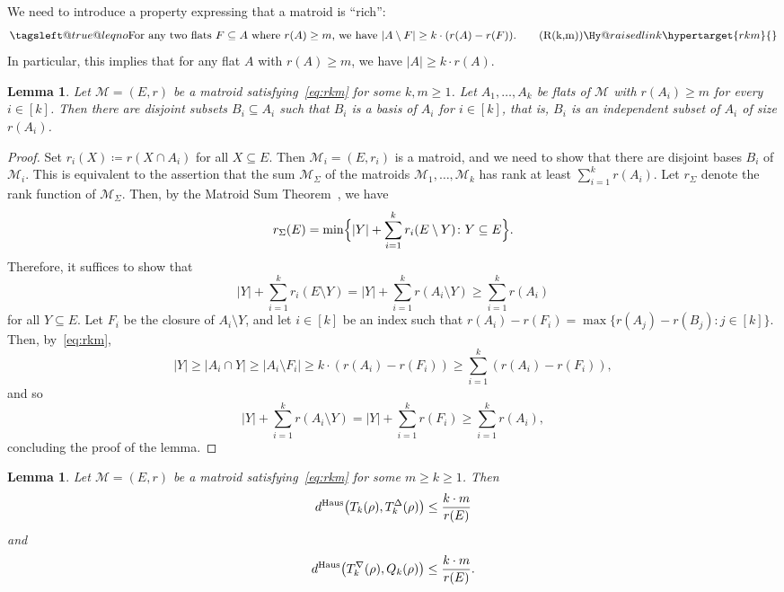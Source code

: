 \documentclass[10pt]{article}
\makeatletter
\newcommand{\leqnomode}{\tagsleft@true\let\veqno\@@leqno}
\newcommand{\linkdest}[1]{\Hy@raisedlink{\hypertarget{#1}{}}}
\theoremstyle{plain}
\newtheorem{lem}[thm]{Lemma}
\theoremstyle{definition}
\newcommand{\MM}{\mathcal{M}}
\newcommand{\Haus}{{\text{\rm Haus}}}
\makeatother
\begin{document}
We need to introduce a property expressing that a matroid is ``rich'':
\begin{equation*}\leqnomode
    \text{For any two flats $F\subseteq A$ where $r(A)\ge m$, we have
$|A\setminus F|\ge k\cdot (r(A)-r(F))$.} \tag*{(R(k,m))}\linkdest{rkm}{} \label{eq:rkm}
\end{equation*}
In particular, this implies that for any flat $A$ with $r(A)\ge m$, we have $|A|\ge k\cdot r(A)$.

\begin{lem}\label{LEM:M-A-BASE}
Let $\MM=(E,r)$ be a matroid satisfying~\ref{eq:rkm} for some $k,m\ge 1$.
Let $A_1,\dots,A_k$ be flats of $\MM$ with $r(A_i)\ge m$ for every $i\in[k]$. Then
there are disjoint subsets $B_i\subseteq A_i$ such that $B_i$ is a basis of
$A_i$ for $i\in[k]$, that is, $B_i$ is an independent subset of $A_i$ of size $r(A_i)$.
\end{lem}
\begin{proof}
Set $r_i(X)\coloneqq r(X\cap A_i)$ for all $X\subseteq E$. Then $\MM_i=(E,r_i)$ is a matroid, and we need to show that there are disjoint bases $B_i$ of $\MM_i$. This is equivalent to the
assertion that the sum $\MM_\Sigma$ of the matroids $\MM_1,\dots,\MM_k$ has rank at least 
$\sum_{i=1}^k r(A_i)$. Let $r_\Sigma$ denote the rank function of $\MM_\Sigma$. Then, by the Matroid Sum Theorem~\cite{edmonds1965transversals}, we have
\[
r_\Sigma(E) = \min\Bigl\{|Y| + \sum_{i=1}^k r_i(E\setminus Y)\colon Y\subseteq E\Bigr\}.
\]
Therefore, it suffices to show that 
\begin{equation*}\label{EQ:Y-BIG}
|Y| + \sum_{i=1}^k r_i(E\setminus Y)
=|Y| + \sum_{i=1}^k r(A_i\setminus Y)
\ge \sum_{i=1}^k r(A_i)
\end{equation*}
for all $Y\subseteq E$. Let $F_i$ be the closure of $A_i\setminus Y$, and let
$i\in[k]$ be an index such that $r(A_i)-r(F_i)=\max\{r(A_j)-r(B_j)\colon j\in[k]\}$. Then, by~\ref{eq:rkm},
\[
|Y| \ge |A_i\cap Y| \ge |A_i\setminus F_i|\ge k \cdot (r(A_i)-r(F_i))\ge \sum_{i=1}^k (r(A_i)-r(F_i)),
\]
and so
\[
|Y|+ \sum_{i=1}^k r(A_i\setminus Y) = |Y|+ \sum_{i=1}^k r(F_i) \ge \sum_{i=1}^k r(A_i),
\]
concluding the proof of the lemma.
\end{proof}

\begin{lem}\label{LEM:M-A-BASE2}
Let $\MM=(E,r)$ be a matroid satisfying~\ref{eq:rkm} for some $m\ge k\ge 1$.
Then
\[
d^\Haus\bigl(T_k(\rho),T_k^\Delta(\rho)\bigr)\le \frac{k\cdot m}{r(E)}
\]
and
\[
d^\Haus\bigl(T_k^\nabla(\rho),Q_k(\rho)\bigr)\le \frac{k\cdot m}{r(E)}.
\]
\end{lem}
\end{document}
